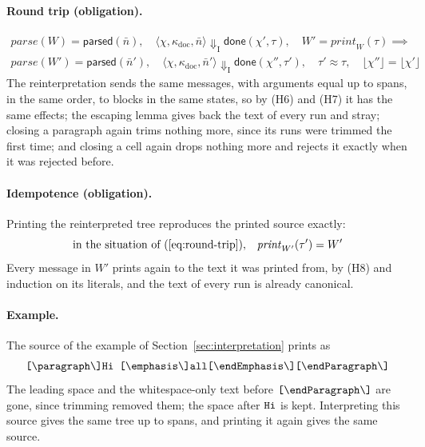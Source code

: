 \documentclass[11pt]{article}
\numberwithin{equation}{section}
\newcommand{\kw}[1]{\ensuremath{\mathsf{#1}}}
\newcommand{\str}[1]{\ensuremath{\text{\texttt{#1}}}}
\newcommand{\bs}{\textbackslash}
\begin{document}
\paragraph{Round trip (obligation).}
\begin{multline}\label{eq:round-trip}
\mathit{parse}(W) = \kw{parsed}(\bar n),\quad
\langle \chi, \kappa_{\mathrm{doc}}, \bar n \rangle \Downarrow_{\mathrm{I}}
  \kw{done}(\chi', \tau),\quad
W' = \mathit{print}_W(\tau)
\implies \\
\mathit{parse}(W') = \kw{parsed}(\bar n'),\quad
\langle \chi, \kappa_{\mathrm{doc}}, \bar n' \rangle \Downarrow_{\mathrm{I}}
  \kw{done}(\chi'', \tau'),\quad
\tau' \approx \tau,\quad
\lfloor \chi'' \rfloor = \lfloor \chi' \rfloor
\end{multline}
The reinterpretation sends the same messages, with arguments equal up to
spans, in the same order, to blocks in the same states, so by (H6) and (H7)
it has the same effects; the escaping lemma gives back the text of every
run and stray; closing a paragraph again trims nothing more, since its
runs were trimmed the first time; and closing a cell again drops nothing
more and rejects it exactly when it was rejected before.

\paragraph{Idempotence (obligation).}
Printing the reinterpreted tree reproduces the printed source exactly:
\begin{equation}\label{eq:print-idempotent}
\text{in the situation of (\ref{eq:round-trip}),}\quad
\mathit{print}_{W'}(\tau') = W'
\end{equation}
Every message in $W'$ prints again to the text it was printed from, by
(H8) and induction on its literals, and the text of every run is already
canonical.

\paragraph{Example.}
The source of the example of Section~\ref{sec:interpretation} prints as
\[
\str{[\bs{}paragraph\bs]Hi\ [\bs{}emphasis\bs]all[\bs{}endEmphasis\bs][\bs{}endParagraph\bs]}
\]
The leading space and the whitespace-only text before
$\str{[\bs{}endParagraph\bs]}$ are gone, since trimming removed them; the
space after $\str{Hi}$ is kept.  Interpreting this source gives the same
tree up to spans, and printing it again gives the same source.
\end{document}
